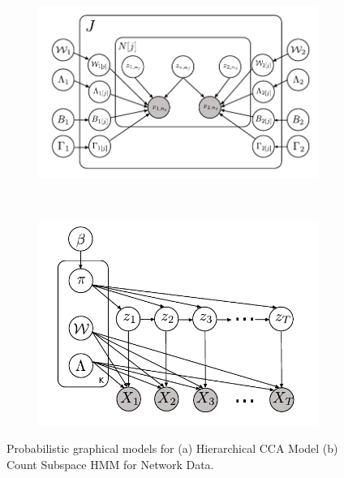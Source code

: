 \documentclass{article}
\begin{document}
\begin{figure}
    \centering
    \begin{subfigure}[b]{0.45\textwidth}
        \includegraphics[width=\textwidth]{CCA.pdf}
        \caption{}
        \label{fig:CCA}
    \end{subfigure}
    ~ %
    \begin{subfigure}[b]{0.45\textwidth}
        \includegraphics[width=\textwidth]{HMM.pdf}
        \caption{}
        \label{fig:HMM}
    \end{subfigure}
    \caption{Probabilistic graphical models for (a) Hierarchical CCA Model (b) Count Subspace HMM for Network Data.}\label{fig:ccaResults}
\end{figure}
\end{document}

